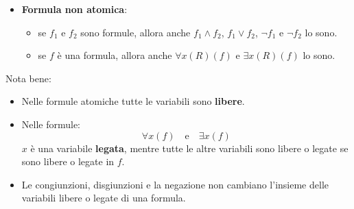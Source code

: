 \documentclass[a4paper,twoside]{article}
\begin{document}
\begin{itemize}
\begin{itemize}
      \item \textbf{Formula non atomica}:
        \begin{itemize}
          \item se \( f_1 \) e \( f_2 \) sono formule, allora anche \( f_1 \land f_2 \),
            \( f_1 \lor f_2 \), \( \lnot f_1 \) e \( \lnot f_2 \) lo sono.
          \item se \( f \) è una formula, allora anche \( \forall x(R)(f) \) e
            \( \exists x(R)(f) \) lo sono.
        \end{itemize}
    \end{itemize}
\end{itemize}

\vspace{1em}
\noindent
Nota bene:
\begin{itemize}
  \item Nelle formule atomiche tutte le variabili sono \textbf{libere}.
  \item Nelle formule:
    \[
      \forall x (f) \quad \text{e} \quad \exists x (f)
    \] 
    \( x \) è una variabile \textbf{legata}, mentre tutte le altre variabili sono 
    libere o legate se sono libere o legate in \( f \).

  \item Le congiunzioni, disgiunzioni e la negazione non cambiano l'insieme delle variabili
    libere o legate di una formula.
\end{itemize}
\end{document}
